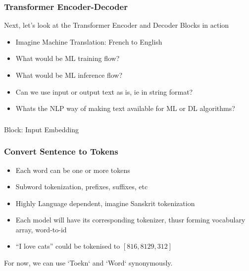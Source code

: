 \begin{frame}[fragile]\frametitle{Transformer Encoder-Decoder}
Next, let’s look at the Transformer Encoder and Decoder Blocks in action


      \begin{itemize}
			\item Imagine Machine Translation: French to English
			\item What would be ML training flow?
			\item What would be ML inference flow?
			\item Can we use input or output text as is, ie in string format?
			\item Whats the NLP way of making text available for ML or DL algorithms?
	\end{itemize}
			
\end{frame}

\begin{frame}[fragile]\frametitle{}
\begin{center}
{\Large Block: Input Embedding}
\end{center}
\end{frame}

\begin{frame}[fragile]\frametitle{Convert Sentence to Tokens}


\begin{itemize}
\item Each word can be one or more tokens
\item Subword tokenization, prefixes, suffixes, etc
\item Highly Language dependent, imagine Sanskrit tokenization
\item Each model will have its corresponding tokenizer, thusr forming vocabulary array, word-to-id
\item ``I love cats''  could be tokenised to $[816, 8129, 312]$
\end{itemize}

For now, we can use `Toekn` and `Word` synonymously.

\end{frame}

